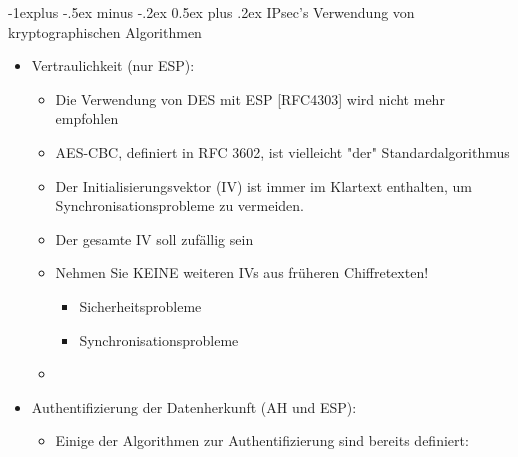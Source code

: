 \documentclass[a4paper]{article}
\makeatletter
\renewcommand{\subsection}{\@startsection{subsection}{2}{0mm}%
 {-1explus -.5ex minus -.2ex}%
 {0.5ex plus .2ex}%
 {\normalfont\normalsize\bfseries}}
\makeatother
\begin{document}
\begin{multicols}{3}
    \subsection{IPsec's Verwendung von kryptographischen
        Algorithmen}

    \begin{itemize}
        \item
              Vertraulichkeit (nur ESP):

              \begin{itemize}
                  \item
                        Die Verwendung von DES mit ESP {[}RFC4303{]} wird nicht mehr
                        empfohlen
                  \item
                        AES-CBC, definiert in RFC 3602, ist vielleicht "der"
                        Standardalgorithmus
                  \item
                        Der Initialisierungsvektor (IV) ist immer im Klartext enthalten, um
                        Synchronisationsprobleme zu vermeiden.
                  \item
                        Der gesamte IV soll zufällig sein
                  \item
                        Nehmen Sie KEINE weiteren IVs aus früheren Chiffretexten!

                        \begin{itemize}
                            \item
                                  Sicherheitsprobleme
                            \item
                                  Synchronisationsprobleme
                        \end{itemize}
                  \item
              \end{itemize}
        \item
              Authentifizierung der Datenherkunft (AH und ESP):

              \begin{itemize}
                  \item
                        Einige der Algorithmen zur Authentifizierung sind bereits definiert:


\end{itemize}
\end{itemize}
\end{multicols}
\end{document}
